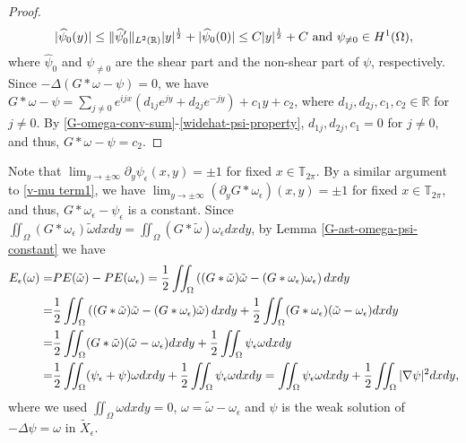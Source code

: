 \documentclass[1 [leqno, 11pt]{amsart}
\numberwithin{equation}{section}
\let\ep=\epsilon
\begin{document}
\begin{CJK*}{GBK}{song}
\begin{proof}
\begin{align}
|\widehat\psi_0(y)|\leq \|\widehat\psi_0'\|_{L^2(\mathbb{R})}|y|^{1\over2}+|\widehat\psi_0(0)|\leq C|y|^{1\over2}+C \text{ and }\psi_{\neq0}\in  H^1(\Omega),
\end{align}
where $\widehat\psi_0$ and $\psi_{\neq0}$  are the shear part  and  the non-shear part of $\psi$, respectively.
 Since $
-\Delta(G\ast \omega-\psi)=0$, we have $G\ast \omega-\psi=\sum_{j\neq0} e^{ijx}(d_{1j}e^{jy}+d_{2j}e^{-jy})+c_1y+c_2$, where  $d_{1j}, d_{2j}, c_1, c_2\in \mathbb{R}$ for $j\neq0$. By \eqref{G-omega-conv-sum}-\eqref{widehat-psi-property}, $d_{1j}, d_{2j}, c_1=0$ for $j\neq0$, and thus, $G\ast \omega-\psi=c_2$.
\end{proof}

Note that $\lim_{y\to\pm\infty}\partial_y\psi_{\ep}(x,y)=\pm1$ for fixed $x\in \mathbb{T}_{2\pi}$.
By a similar argument to \eqref{v-mu term1}, we have $\lim_{y\to\pm\infty}(\partial_y G* \omega_\ep)(x,y)=\pm1$ for fixed $x\in \mathbb{T}_{2\pi}$, and thus,
$G\ast\omega_{\ep}-\psi_{\ep}$ is a constant.
Since $\iint_{\Omega}(G\ast\omega_{\ep}) \tilde \omega dxdy=\iint_{\Omega}(G\ast\tilde \omega) \omega_{\ep} dxdy$, by Lemma \ref{G-ast-omega-psi-constant} we have
\begin{align*}
E_\ep(\omega)=&PE(\tilde \omega)-PE(\omega_{\ep})={1\over2}\iint_{\Omega}\left((G\ast\tilde \omega)\tilde \omega -(G\ast\omega_{\ep}) \omega_{\ep}\right) dxdy\\
=&{1\over2} \iint_{\Omega}\left((G\ast\tilde \omega)\tilde \omega -(G\ast\omega_{\ep}) \tilde \omega \right) dxdy+{1\over2} \iint_{\Omega}(G\ast\omega_{\ep}) (\tilde \omega-\omega_{\ep}) dxdy\\
=&{1\over2} \iint_{\Omega}(G\ast\tilde \omega)(\tilde \omega-\omega_{\ep}) dxdy+{1\over2} \iint_{\Omega}\psi_{\ep}  \omega dxdy\\
=&{1\over2} \iint_{\Omega}(\psi_{\ep}+\psi)\omega dxdy+{1\over2} \iint_{\Omega}\psi_{\ep}  \omega dxdy= \iint_{\Omega}\psi_{\ep}\omega dxdy+{1\over2}\iint_{\Omega}|\nabla \psi|^2dxdy,
\end{align*}
where we used $\iint_{\Omega}\omega dxdy=0$, $\omega=\tilde \omega-\omega_{\ep}$ and $\psi$ is the weak solution of $-\Delta \psi = \omega$ in $\tilde{X}_\ep$.



\end{CJK*}
\end{document}
